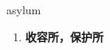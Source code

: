 
\begin{frame}
{\huge asylum}
\begin{center}
\begin{enumerate}\Large
  \item \textbf{收容所，保护所}
\end{enumerate}
\end{center}
\end{frame}
